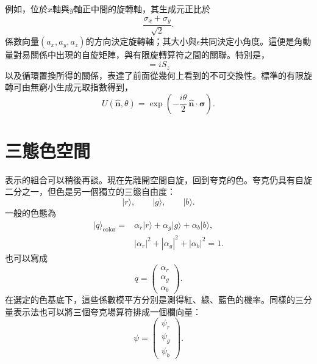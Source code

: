 例如，位於\(x\)軸與\(y\)軸正中間的旋轉軸，其生成元正比於
\begin{equation}
\frac{\sigma_x+\sigma_y}{\sqrt2}.
\end{equation}
係數向量\((a_x,a_y,a_z)\)的方向決定旋轉軸；其大小與\(\epsilon\)共同決定小角度。這便是角動量對易關係中出現的自旋矩陣，與有限旋轉算符之間的關聯。特別是，
\begin{equation}
[S_x,S_y]=iS_z
\end{equation}
以及循環置換所得的關係，表達了前面從幾何上看到的不可交換性。標準的有限旋轉可由無窮小生成元取指數得到，
\begin{equation}
U(\hat{\boldsymbol n},\theta)
=\exp\left(-\frac{i\theta}{2}\,
\hat{\boldsymbol n}\cdot\boldsymbol\sigma\right).
\end{equation}
\section{三態色空間}

表示的組合可以稍後再談。現在先離開空間自旋，回到夸克的色。夸克仍具有自旋二分之一，但色是另一個獨立的三態自由度：
\begin{equation}
\lvert r\rangle,\qquad
\lvert g\rangle,\qquad
\lvert b\rangle.
\end{equation}
一般的色態為
\begin{equation}
\begin{aligned}
\lvert q\rangle_{\mathrm{color}}
={}&
\alpha_r\lvert r\rangle
+\alpha_g\lvert g\rangle
+\alpha_b\lvert b\rangle,
\\
&|\alpha_r|^2+|\alpha_g|^2+|\alpha_b|^2=1.
\end{aligned}
\end{equation}
也可以寫成
\begin{equation}
q=
\begin{pmatrix}
\alpha_r\\
\alpha_g\\
\alpha_b
\end{pmatrix}.
\end{equation}
在選定的色基底下，這些係數模平方分別是測得紅、綠、藍色的機率。同樣的三分量表示法也可以將三個夸克場算符排成一個欄向量：
\begin{equation}
\psi=
\begin{pmatrix}
\psi_r\\
\psi_g\\
\psi_b
\end{pmatrix}.
\end{equation}

